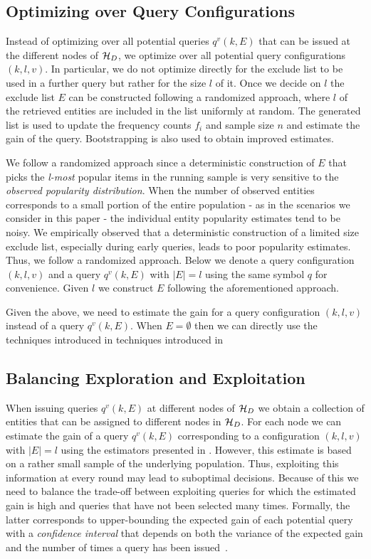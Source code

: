\subsection{Optimizing over Query Configurations}
\label{sec:config}
Instead of optimizing over all potential queries $q^v(k,E)$ that can be issued at the different nodes of $\mathcal{H}_D$, we optimize over all potential query configurations $(k,l,v)$. In particular, we do not optimize directly for the exclude list to be used in a further query but rather for the size $l$ of it. Once we decide on $l$ the exclude list $E$ can be constructed following a randomized approach, where $l$ of the retrieved entities are included in the list uniformly at random. The generated list is used to update the frequency counts $f_i$ and sample size $n$ and estimate the gain of the query. Bootstrapping is also used to obtain improved estimates. 

We follow a randomized approach since a deterministic construction of $E$ that picks the {\em l-most} popular items in the running sample is very sensitive to the {\em observed popularity distribution}. When the number of observed entities corresponds to a small portion of the entire population - as in the scenarios we consider in this paper - the individual entity popularity estimates tend to be noisy.  We empirically observed that a deterministic construction of a limited size exclude list, especially during early queries, leads to poor popularity estimates. Thus, we follow a randomized approach. Below we denote a query configuration $(k,l,v)$ and a query $q^v(k,E)$ with $|E| = l$ using the same symbol $q$ for convenience. Given $l$ we construct $E$ following the aforementioned approach.

Given the above, we need to estimate the gain for a query configuration $(k,l,v)$ instead of a query $q^v(k,E)$. When $E = \emptyset$ then we can directly use the techniques introduced in  techniques introduced in \Cref{} 

\subsection{Balancing Exploration and Exploitation}
\label{sec:balancing}
When issuing queries $q^v(k,E)$ at different nodes of $\mathcal{H}_D$ we obtain a collection of entities that can be assigned to different nodes in $\mathcal{H}_D$. For each node we can estimate the gain of a query $q^v(k,E)$ corresponding to a configuration $(k,l,v)$ with $|E| =  l$ using the estimators presented in . However, this estimate is based on a rather small sample of the underlying population. Thus, exploiting this information at every round may lead to suboptimal decisions. Because of this we need to balance the trade-off between exploiting queries for which the estimated gain is high and queries that have not been selected many times. Formally, the latter corresponds to upper-bounding the expected gain of each potential query with a {\em confidence interval} that depends on both the variance of the expected gain and the number of times a query has been issued~\cite{Auer:2003}.

